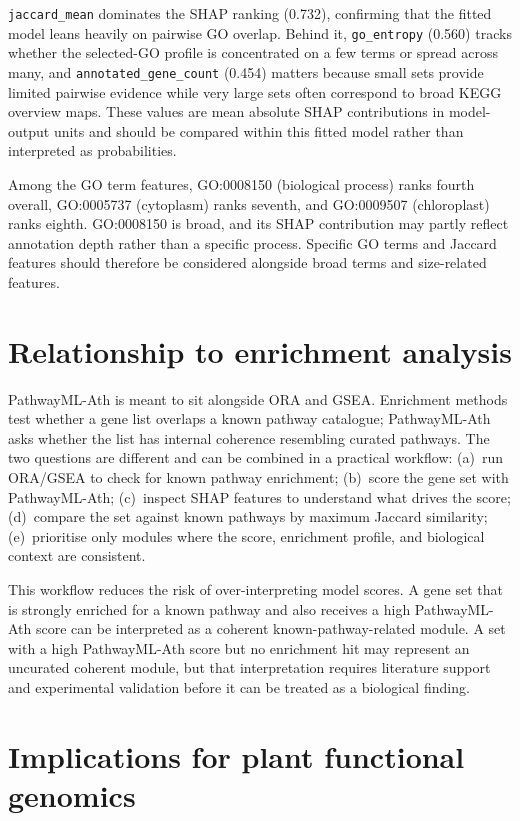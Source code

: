 \documentclass[12pt,letterpaper,oneside,openany]{book}
\begin{document}
\texttt{jaccard\_mean} dominates the SHAP ranking (0.732), confirming that the fitted model leans heavily on pairwise GO overlap. Behind it, \texttt{go\_entropy} (0.560) tracks whether the selected-GO profile is concentrated on a few terms or spread across many, and \texttt{annotated\_gene\_count} (0.454) matters because small sets provide limited pairwise evidence while very large sets often correspond to broad KEGG overview maps. These values are mean absolute SHAP contributions in model-output units and should be compared within this fitted model rather than interpreted as probabilities.

Among the GO term features, GO:0008150 (biological process) ranks fourth overall, GO:0005737 (cytoplasm) ranks seventh, and GO:0009507 (chloroplast) ranks eighth. GO:0008150 is broad, and its SHAP contribution may partly reflect annotation depth rather than a specific process. Specific GO terms and Jaccard features should therefore be considered alongside broad terms and size-related features.

\section{Relationship to enrichment analysis}
\label{sec:disc_practical_workflow}

PathwayML-Ath is meant to sit alongside ORA and GSEA. Enrichment methods test whether a gene list overlaps a known pathway catalogue; PathwayML-Ath asks whether the list has internal coherence resembling curated pathways. The two questions are different and can be combined in a practical workflow: (a)~run ORA/GSEA to check for known pathway enrichment; (b)~score the gene set with PathwayML-Ath; (c)~inspect SHAP features to understand what drives the score; (d)~compare the set against known pathways by maximum Jaccard similarity; (e)~prioritise only modules where the score, enrichment profile, and biological context are consistent.

This workflow reduces the risk of over-interpreting model scores. A gene set that is strongly enriched for a known pathway and also receives a high PathwayML-Ath score can be interpreted as a coherent known-pathway-related module. A set with a high PathwayML-Ath score but no enrichment hit may represent an uncurated coherent module, but that interpretation requires literature support and experimental validation before it can be treated as a biological finding.

\section{Implications for plant functional genomics}
\label{sec:disc_plant_implications}
\end{document}
